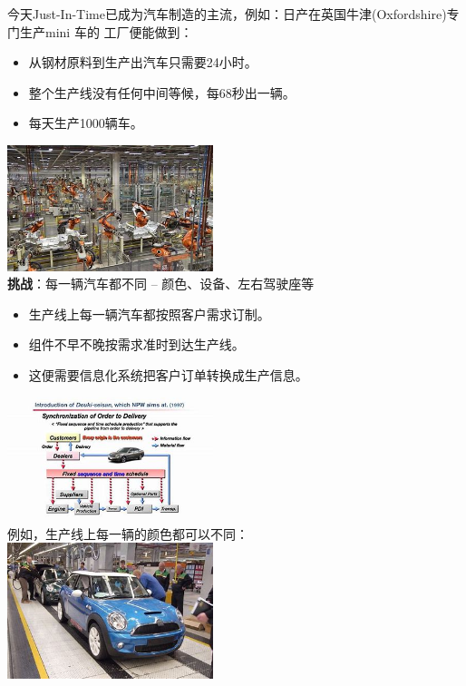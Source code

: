 今天Just-In-Time已成为汽车制造的主流，例如：日产在英国牛津(Oxfordshire)专门生产mini
车的 工厂便能做到：

\begin{itemize}
\tightlist
\item
  从钢材原料到生产出汽车只需要24小时。
\item
  整个生产线没有任何中间等候，每68秒出一辆。
\item
  每天生产1000辆车。
\end{itemize}

\includegraphics[width=6cm]{NissanRobots-OIPh8UAC7FBjlaCmA_mBepJjQHaEi.jpg}\\
\textbf{挑战}：每一辆汽车都不同 -- 颜色、设备、左右驾驶座等

\begin{itemize}
\tightlist
\item
  生产线上每一辆汽车都按照客户需求订制。
\item
  组件不早不晚按需求准时到达生产线。
\item
  这便需要信息化系统把客户订单转换成生产信息。
\end{itemize}

\includegraphics[width=6cm]{NissanJIT_OIPRQGKy67DWGTu-DQiOCqW2gHaEK.jpg}\\

例如，生产线上每一辆的颜色都可以不同：\\
\includegraphics[width=6cm]{NissanProdLineOIPwJFmfMl7q2_V8JaQi4kQ8QHaE6.jpg}\\

